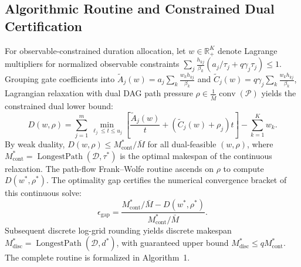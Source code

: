 \documentclass[10pt,letterpaper,journal]{IEEEtran}
\begin{document}
\subsection{Algorithmic Routine and Constrained Dual Certification}
For observable-constrained duration allocation, let $w \in \mathbb{R}_+^K$ denote Lagrange multipliers for normalized observable constraints $\sum_j \frac{h_{kj}}{\beta_k}(a_j/\tau_j + q\gamma_j\tau_j) \le 1$. Grouping gate coefficients into $\tilde{A}_j(w) = a_j \sum_k \frac{w_k h_{kj}}{\beta_k}$ and $\tilde{C}_j(w) = q\gamma_j \sum_k \frac{w_k h_{kj}}{\beta_k}$, Lagrangian relaxation with dual DAG path pressure $\rho \in \frac{1}{\bar{M}}\operatorname{conv}(\mathcal{P})$ yields the constrained dual lower bound:
\begin{equation}\label{eq:constrained_dual}
D(w, \rho) = \sum_{j=1}^m \min_{\ell_j \le t \le u_j} \left[ \frac{\tilde{A}_j(w)}{t} + (\tilde{C}_j(w) + \rho_j)t \right] - \sum_{k=1}^K w_k.
\end{equation}
By weak duality, $D(w, \rho) \le M_{\mathrm{cont}}^*/\bar{M}$ for all dual-feasible $(w, \rho)$, where $M_{\mathrm{cont}}^* = \operatorname{LongestPath}(\mathcal{D}, \tau^*)$ is the optimal makespan of the continuous relaxation. The path-flow Frank--Wolfe routine ascends on $\rho$ to compute $D(w^*, \rho^*)$. The optimality gap certifies the numerical convergence bracket of this continuous solve:
\begin{equation}
\epsilon_{\mathrm{gap}} = \frac{M_{\mathrm{cont}}^*/\bar{M} - D(w^*, \rho^*)}{M_{\mathrm{cont}}^*/\bar{M}}.
\end{equation}
Subsequent discrete log-grid rounding yields discrete makespan $M_{\mathrm{disc}}^* = \operatorname{LongestPath}(\mathcal{D}, d^*)$, with guaranteed upper bound $M_{\mathrm{disc}}^* \le q M_{\mathrm{cont}}^*$. The complete routine is formalized in Algorithm~1.
\end{document}
